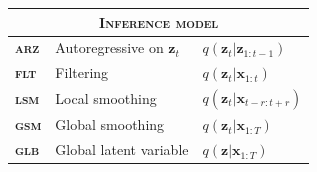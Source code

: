 \begin{frame}
\begin{table}
{\begin{tabular}{ l l l }
                \midrule
                \multicolumn{3}{c}{\textsc{Inference model}} \\
                \midrule
                \textbf{\textsc{arz}} & Autoregressive on $\mathbf{z}_t$      & $q(\mathbf{z}_t|\mathbf{z}_{1:t-1})$ \\
                \textbf{\textsc{flt}} & Filtering                             & $q(\mathbf{z}_t|\mathbf{x}_{1:t})$ \\
                \textbf{\textsc{lsm}} & Local smoothing                       & $q(\mathbf{z}_t|\mathbf{x}_{t-r:t+r})$ \\
                \textbf{\textsc{gsm}} & Global smoothing                      & $q(\mathbf{z}_t|\mathbf{x}_{1:T})$ \\
                \textbf{\textsc{glb}} & Global latent variable                & $q(\mathbf{z}|\mathbf{x}_{1:T})$ \\
                \bottomrule
            \end{tabular}
        }
    \end{table}

\end{frame}


